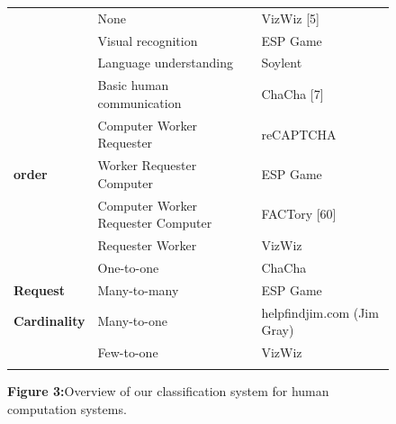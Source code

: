 \documentclass{acm_proc_article-sp}
\newcommand{\carrow}{\ding{225}}
\begin{document}
\begin{figure}[t]
\begin{tabular}{|l|l|l|}
\textbf{}                                  & None                                                           & VizWiz {[}5{]}                                                     \\  \Xhline{1mm}
\multicolumn{1}{|l|}{\textbf{Human skill}} & \multicolumn{1}{l|}{Visual recognition}                        & \multicolumn{1}{l|}{ESP Game}                                      \\  \cline{2-3}
\multicolumn{1}{|l|}{\textbf{}}            & \multicolumn{1}{l|}{Language understanding}                    & \multicolumn{1}{l|}{Soylent}                                       \\  \cline{2-3}
\textbf{}                                 & Basic human communication                                      & ChaCha {[}7{]}                                                     \\  \Xhline{2\arrayrulewidth}
\multicolumn{1}{|l|}{\textbf{Process}}     & \multicolumn{1}{l|}{Computer \carrow Worker \carrow Requester} & \multicolumn{1}{l|}{reCAPTCHA}              \\  \cline{2-3}
\multicolumn{1}{|l|}{\textbf{order}}       & \multicolumn{1}{l|}{Worker \carrow Requester \carrow Computer}             & \multicolumn{1}{l|}{ESP Game}                                      \\  \cline{2-3}
\multicolumn{1}{|l|}{\textbf{}}            & \multicolumn{1}{l|}{Computer \carrow Worker \carrow Requester \carrow Computer}  & \multicolumn{1}{l|}{FACTory {[}60{]}}                              \\  \cline{2-3}
\textbf{}                                  & Requester \carrow Worker                                             & VizWiz                                                             \\  \Xhline{1mm}
\multicolumn{1}{|l|}{\textbf{Task-}}       & \multicolumn{1}{l|}{One-to-one}                                & \multicolumn{1}{l|}{ChaCha}                                        \\  \cline{2-3}
\multicolumn{1}{|l|}{\textbf{Request}}     & \multicolumn{1}{l|}{Many-to-many}                              & \multicolumn{1}{l|}{ESP Game}                                      \\  \cline{2-3}
\multicolumn{1}{|l|}{\textbf{Cardinality}} & \multicolumn{1}{l|}{Many-to-one}                               & \multicolumn{1}{l|}{helpfindjim.com (Jim Gray)}                    \\  \cline{2-3}
\multicolumn{1}{|l|}{\textbf{}}            & \multicolumn{1}{l|}{Few-to-one}                                & \multicolumn{1}{l|}{VizWiz}                                        \\ \Xhline{1mm}
\end{tabular}

\textbf{Figure 3:}Overview of our classification system for human computation systems.
\end{figure}
\end{document}
